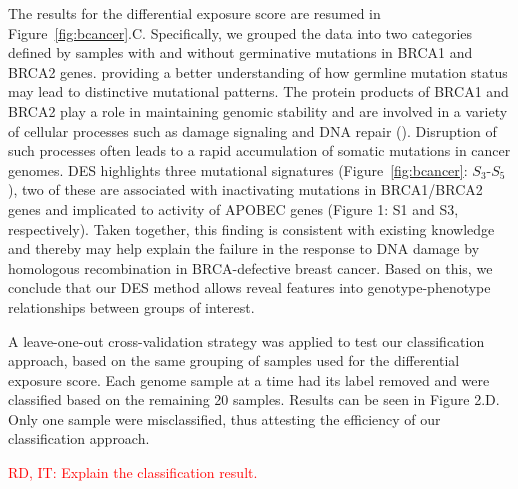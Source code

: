 \documentclass{bioinfo}
\begin{document}
The results for the differential exposure score are resumed in 
Figure~\ref{fig:bcancer}.C. Specifically, we grouped the data into two
categories defined by samples with and without germinative mutations
in BRCA1 and BRCA2 genes. 
providing a better understanding of how germline mutation status may
lead to distinctive mutational patterns. The protein products of BRCA1
and BRCA2 play a role in maintaining genomic stability and are
involved in a variety of cellular processes such as damage signaling
and DNA repair (\citealp{LY}). Disruption of such processes often
leads to a rapid accumulation of somatic mutations in cancer
genomes. DES highlights three mutational signatures
(Figure~\ref{fig:bcancer}: $S_3$-$S_5$), two of these are associated
with inactivating mutations in BRCA1/BRCA2 genes and
implicated to activity of APOBEC genes (Figure 1: S1 and S3, respectively). Taken
together, this finding is consistent with existing knowledge and
thereby may help explain the failure in the response to DNA damage by
homologous recombination in BRCA-defective breast cancer. Based on
this, we conclude that our DES method allows reveal features into
genotype-phenotype relationships between groups of interest.

A leave-one-out cross-validation strategy was applied to test our 
classification approach, based on the same grouping of samples used 
for the differential exposure score. Each genome sample at a time had 
its label removed and were classified based on the remaining 20 samples. 
Results can be seen in Figure 2.D. Only one sample were misclassified, 
thus attesting the efficiency of our classification approach. 
 
\textcolor{red}{RD, IT: Explain the classification result.}
\end{document}
